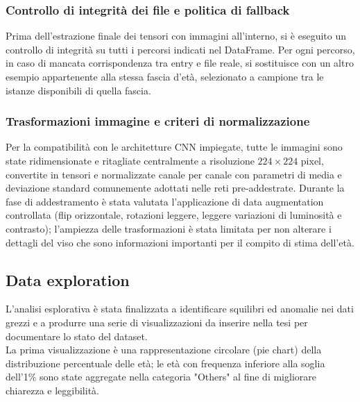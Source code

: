 \documentclass[a4paper,12pt]{report}
\begin{document}
	\subsubsection{Controllo di integrità dei file e politica di fallback}
	Prima dell'estrazione finale dei tensori con immagini all'interno, si è eseguito un controllo di integrità su tutti i percorsi indicati nel DataFrame. Per ogni percorso, in caso di mancata corrispondenza tra entry e file reale, si sostituisce con un altro esempio appartenente alla stessa fascia d'età, selezionato a campione tra le istanze disponibili di quella fascia.
	
	\subsubsection{Trasformazioni immagine e criteri di normalizzazione}
	Per la compatibilità con le architetture CNN impiegate, tutte le immagini sono state ridimensionate e ritagliate centralmente a risoluzione \(224\times224\) pixel, convertite in tensori e normalizzate canale per canale con parametri di media e deviazione standard comunemente adottati nelle reti pre-addestrate. Durante la fase di addestramento è stata valutata l'applicazione di data augmentation controllata (flip orizzontale, rotazioni leggere, leggere variazioni di luminosità e contrasto); l'ampiezza delle trasformazioni è stata limitata per non alterare i dettagli del viso che sono informazioni importanti per il compito di stima dell'età.
	
	\subsection{Data exploration}	
	L'analisi esplorativa è stata finalizzata a identificare squilibri ed anomalie nei dati grezzi e a produrre una serie di visualizzazioni da inserire nella tesi per documentare lo stato del dataset. \\
	La prima visualizzazione è una rappresentazione circolare (pie chart) della distribuzione percentuale delle età; le età con frequenza inferiore alla soglia dell'1\% sono state aggregate nella categoria "Others" al fine di migliorare chiarezza e leggibilità. \\
	
\end{document}
